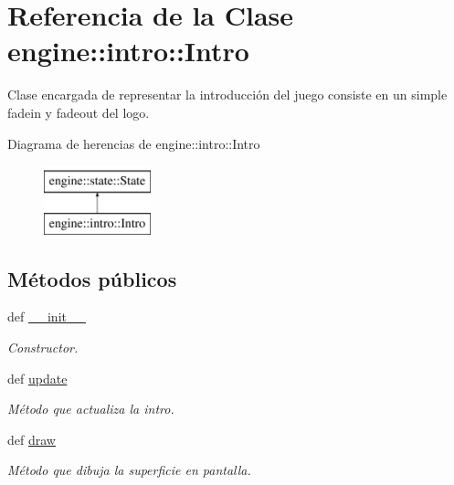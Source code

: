 \hypertarget{classengine_1_1intro_1_1Intro}{
\section{\-Referencia de la \-Clase engine\-:\-:intro\-:\-:\-Intro}
\label{classengine_1_1intro_1_1Intro}
}


\-Clase encargada de representar la introducción del juego consiste en un simple fadein y fadeout del logo.  


\-Diagrama de herencias de engine\-:\-:intro\-:\-:\-Intro\begin{figure}[H]
\begin{center}
\leavevmode
\includegraphics[height=2.000000cm]{classengine_1_1intro_1_1Intro}
\end{center}
\end{figure}
\subsection*{\-Métodos públicos}
\begin{DoxyCompactItemize}
\item 
def \hyperlink{classengine_1_1intro_1_1Intro_a8c919f608e909df7fbac780d01bf5e74}{\-\_\-\-\_\-init\-\_\-\-\_\-}
\begin{DoxyCompactList}\small\item\em \-Constructor. \end{DoxyCompactList}\item 
\hypertarget{classengine_1_1intro_1_1Intro_a2f466b95367cf3773ed388c6c17a1879}{
def \hyperlink{classengine_1_1intro_1_1Intro_a2f466b95367cf3773ed388c6c17a1879}{update}}
\label{classengine_1_1intro_1_1Intro_a2f466b95367cf3773ed388c6c17a1879}

\begin{DoxyCompactList}\small\item\em \-Método que actualiza la intro. \end{DoxyCompactList}\item 
def \hyperlink{classengine_1_1intro_1_1Intro_a0eb57fc90b5654163b7a460170416365}{draw}
\begin{DoxyCompactList}\small\item\em \-Método que dibuja la superficie en pantalla. \end{DoxyCompactList}\end{DoxyCompactItemize}
